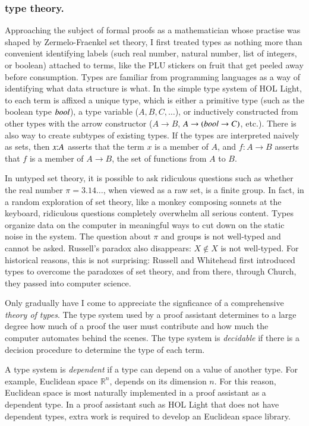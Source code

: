 \documentclass{llncs}
\def\op#1{{\hbox{#1}}}
\def\tc{\hbox{:}}
\newcommand{\ring}[1]{\mathbb{#1}}
\begin{document}
\subsubsection{type theory.}

Approaching the subject of formal proofs as a mathematician whose
practise was shaped by Zermelo-Fraenkel set theory, I first treated
types as nothing more than convenient identifying labels (such real
number, natural number, list of integers, or boolean) attached to terms,
like the 
PLU stickers on fruit that get peeled
away before consumption.  Types are familiar from programming
languages as a way of identifying what data structure is what.  In the
simple type system of HOL Light, to each term is affixed a unique
type, which is either a primitive type (such as the boolean type
$\op{\it bool}$), a type variable ($A,B,C,\ldots$), or inductively
constructed from other types with the arrow constructor
($A\rightarrow B$, $A\rightarrow (\op{\it bool} \rightarrow C)$,
etc.).  There is also way to create subtypes of existing types.
If the types are interpreted naively as sets, then $x\tc A$
asserts that the term $x$ is a member of $A$, and $f:A\rightarrow B$
asserts that $f$ is a member of $A\rightarrow B$, the set of functions
from $A$ to $B$.

In untyped set theory, it is possible to ask ridiculous questions such
as whether the real number $\pi=3.14\ldots$, when viewed as a raw set,
is a finite group.  In fact, in a random exploration of set theory,
like a monkey composing sonnets at the keyboard, ridiculous questions
completely overwhelm all serious content.  Types organize data on the
computer in meaningful ways to cut down on the static noise in the
system.  The question about $\pi$ and groups is not well-typed and
cannot be asked.  Russell's paradox also disappears: $X \not\in X$ is
not well-typed.  For historical reasons, this is not surprising:
Russell and Whitehead first introduced types to overcome the paradoxes of
set theory, and from there, through Church, they passed into computer
science.


Only gradually have I come to appreciate the signficance of a
comprehensive {\it theory of types}.  The type system used by a proof
assistant determines to a large degree how much of a proof the user
must contribute and how much the computer automates behind the scenes.
The type system is {\it decidable} if there is a decision procedure to
determine the type of each term.

A type system is {\it dependent} if a type can depend on a value of
another type.  For example, Euclidean space $\ring{R}^n$, depends on
its dimension $n$.  For this reason, Euclidean space is most naturally
implemented in a proof assistant as a dependent type.  
In a proof assistant such as HOL Light that does not have dependent types,
extra work is required to develop an Euclidean space library.
\end{document}
